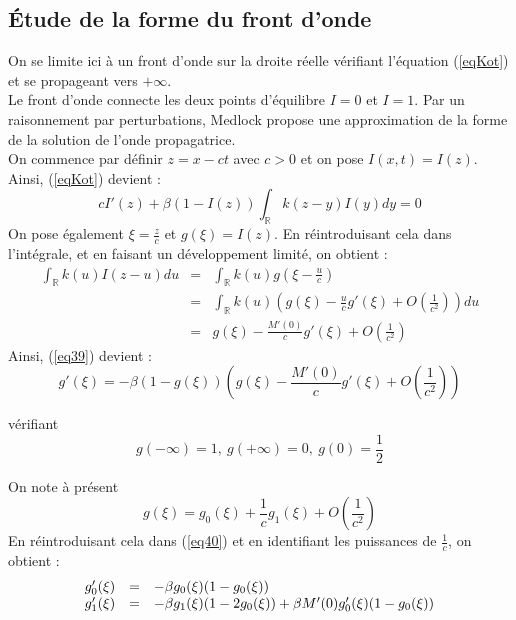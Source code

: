 \documentclass{article}
\begin{document}
\subsection{Étude de la forme du front d'onde}
On se limite ici à un front d'onde sur la droite réelle vérifiant l'équation (\ref{eqKot}) et se propageant vers $+\infty$.\\
Le front d'onde connecte les deux points d'équilibre $I=0$ et $I=1$. Par un raisonnement par perturbations, Medlock \cite{KotMedlock03} propose une approximation de la forme de la solution de l'onde propagatrice.\\
On commence par définir $z=x-ct$ avec $c>0$ et on pose $I(x,t)=I(z)$. Ainsi, (\ref{eqKot}) devient :
\begin{equation}\label{eq39}
	cI'(z)+\beta(1-I(z))\int_{\mathbb{R}}k(z-y)I(y)dy=0
\end{equation}
On pose également $\xi=\frac{z}{c}$ et $g(\xi)=I(z)$. En réintroduisant cela dans l'intégrale, et en faisant un développement limité, on obtient :
\begin{eqnarray*}
	\int_{\mathbb{R}}k(u)I(z-u)du&=&\int_{\mathbb{R}} k(u)g\left(\xi-\frac{u}{c}\right)\\
				&=& \int_{\mathbb{R}} k(u)\left( g(\xi)-\frac{u}{c} g'(\xi)+O\left(\frac{1}{c^2}\right)\right) du\\
				&=& g(\xi) -\frac{M'(0)}{c} g'(\xi) +O\left(\frac{1}{c^2}\right)
\end{eqnarray*}
Ainsi, (\ref{eq39}) devient :
\begin{equation}\label{eq40}
	g'(\xi)=-\beta(1-g(\xi))\left( g(\xi)-\frac{M'(0)}{c}g'(\xi)+O\left(\frac{1}{c^2}\right)\right)
\end{equation}

vérifiant
\begin{equation}\label{condBor}
	g(-\infty)=1,\ g(+\infty)=0,\ g(0)=\frac{1}{2}
\end{equation}

On note à présent \[g(\xi)=g_0(\xi)+\frac{1}{c} g_1(\xi)+O\left(\frac{1}{c^2}\right)\]
En réintroduisant cela dans (\ref{eq40}) et en identifiant les puissances de $\frac{1}{c}$, on obtient :
\begin{equation}\label{eqPert}
\begin{array}{r c l}
	g_0'(\xi)&=&-\beta g_0(\xi)(1-g_0(\xi))\\
	g_1'(\xi)&=&-\beta g_1(\xi)(1-2g_0(\xi))+\beta M'(0)g_0'(\xi)(1-g_0(\xi))
\end{array}
\end{equation}
\end{document}
